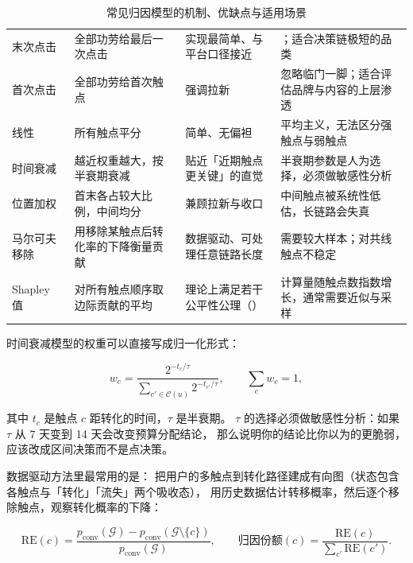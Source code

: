 \begin{table}[htbp]
\centering
\caption{常见归因模型的机制、优缺点与适用场景}
\label{tab:growth-attrib-models}
\small
\begin{tabularx}{\textwidth}{L{2.3cm} L{3.5cm} L{3.0cm} Y}
\toprule
{} &  &  &  \\
\midrule
末次点击 & 全部功劳给最后一次点击 & 实现最简单、与平台口径接近 & ；适合决策链极短的品类 \\
\addlinespace
首次点击 & 全部功劳给首次触点 & 强调拉新 & 忽略临门一脚；适合评估品牌与内容的上层渗透 \\
\addlinespace
线性 & 所有触点平分 & 简单、无偏袒 & 平均主义，无法区分强触点与弱触点 \\
\addlinespace
时间衰减 & 越近权重越大，按半衰期衰减 & 贴近「近期触点更关键」的直觉 & 半衰期参数是人为选择，必须做敏感性分析 \\
\addlinespace
位置加权 & 首末各占较大比例，中间均分 & 兼顾拉新与收口 & 中间触点被系统性低估，长链路会失真 \\
\addlinespace
马尔可夫移除 & 用移除某触点后转化率的下降衡量贡献 & 数据驱动、可处理任意链路长度 & 需要较大样本；对共线触点不稳定 \\
\addlinespace
Shapley 值 & 对所有触点顺序取边际贡献的平均 & 理论上满足若干公平性公理（\cite{shapley1953value}） & 计算量随触点数指数增长，通常需要近似与采样 \\
\bottomrule
\end{tabularx}
\end{table}

时间衰减模型的权重可以直接写成归一化形式：

\begin{equation}
w_c = \frac{2^{-t_c/\tau}}{\sum_{c' \in \mathcal{C}(u)} 2^{-t_{c'}/\tau}} ,
\qquad \sum_{c} w_c = 1 ,
\label{eq:growth-time-decay}
\end{equation}

其中 $t_c$ 是触点 $c$ 距转化的时间，$\tau$ 是半衰期。
$\tau$ 的选择必须做敏感性分析：如果 $\tau$ 从 7 天变到 14 天会改变预算分配结论，
那么说明你的结论比你以为的更脆弱，应该改成区间决策而不是点决策。

数据驱动方法里最常用的是：
把用户的多触点到转化路径建成有向图（状态包含各触点与「转化」「流失」两个吸收态），
用历史数据估计转移概率，然后逐个移除触点，观察转化概率的下降：

\begin{equation}
\text{RE}(c) = \frac{p_{\text{conv}}(\mathcal{G}) - p_{\text{conv}}(\mathcal{G} \setminus \{c\})}
{p_{\text{conv}}(\mathcal{G})},
\qquad
\text{归因份额}(c) = \frac{\text{RE}(c)}{\sum_{c'} \text{RE}(c')} .
\label{eq:growth-markov-removal}
\end{equation}

